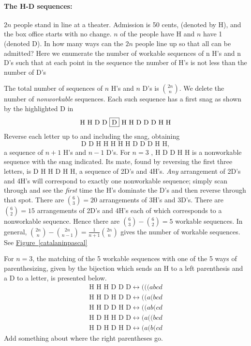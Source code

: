 \documentclass[10pt,]{book}
\theoremstyle{plain}
\theoremstyle{definition}
\theoremstyle{definition}
\theoremstyle{definition}
\theoremstyle{definition}
\numberwithin{equation}{chapter}
\newcommand{\alert}{\fbox}
\begin{document}
\paragraph[{The H-D sequences:}]{The H-D sequences:}\hypertarget{paragraphs-8}{}
\hypertarget{p-789}{}%
\(2n\) people stand in line at a theater. Admission is 50 cents, (denoted by H), and the box office starts with no change. \(n\) of the people have H and \(n\) have \textdollar{}1 (denoted D). In how many ways can the \(2n\) people line up so that all can be admitted? Here we enumerate the number of workable sequences of n H's and n D's such that at each point in the sequence the number of H's is not less than the number of D's%
\par
\hypertarget{p-790}{}%
The total number of sequences of \(n\) H's and \(n\) D's is \(\binom{2n}{n}\). We delete the number of \emph{nonworkable} sequences. Each such sequence has a first snag as shown by the highlighted D in%
\begin{equation*}
\text{H\ H\ D\ D\ \alert{D}\ H\ H\ D\ D\ D\ H\ H}
\end{equation*}
Reverse each letter up to and including the snag, obtaining%
\begin{equation*}
\text{D D H H H H H D D D H H},
\end{equation*}
a sequence of \(n+1\) H's and \(n-1\) D's. For \(n = 3\) , H D \alert{D} D H H is a nonworkable sequence with the snag indicated. Its mate, found by reversing the first three letters, is D H H D H H, a sequence of 2D's and 4H's. \emph{Any} arrangement of 2D's and 4H's will correspond to exactly one nonworkable sequence; simply scan through and see the \emph{first} time the H's dominate the D's and then reverse through that spot. There are \(\binom{6}{3}
= 20\) arrangements of 3H's and 3D's. There are \(\binom{6}{2}
= 15\) arrangements of 2D's and 4H's each of which corresponds to a nonworkable sequence. Hence there are \(\binom{6}{3}
-\binom{6}{2} = 5\) workable sequences. In general, \(\binom{2n}{n}  - \binom{2n}{n - 1} = \frac{1}{n + 1}\binom{2n}{n}\) gives the number of workable sequences. See \hyperref[catalaninpascal]{Figure~\ref{catalaninpascal}}%
\par
\hypertarget{p-791}{}%
For \(n=3\), the matching of the 5 workable sequences with one of the 5 ways of parenthesizing, given by the bijection which sends an H to a left parenthesis and a D to a letter, is presented below.%
%
\begin{gather*}
\text{H H H D D D} \leftrightarrow  (((abcd \\
\text{H H D H D D} \leftrightarrow  ((a(bcd \\
\text{H H D D H D} \leftrightarrow  ((ab(cd \\
\text{H D H H D D} \leftrightarrow  (a((bcd \\
\text{H D H D H D} \leftrightarrow  (a(b(cd 
\end{gather*}
Add something about where the right parentheses go.\typeout{************************************************}
\typeout{************************************************}
\end{document}
